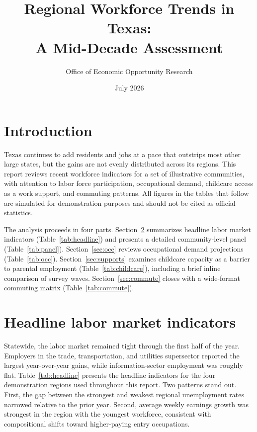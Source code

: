 \documentclass[11pt]{article}
\title{Regional Workforce Trends in Texas:\\ A Mid-Decade Assessment}
\author{Office of Economic Opportunity Research}
\date{July 2026}
\begin{document}
\maketitle

\section{Introduction}

Texas continues to add residents and jobs at a pace that outstrips most other
large states, but the gains are not evenly distributed across its regions. This
report reviews recent workforce indicators for a set of illustrative
communities, with attention to labor force participation, occupational demand,
childcare access as a work support, and commuting patterns. All figures in the
tables that follow are simulated for demonstration purposes and should not be
cited as official statistics.

The analysis proceeds in four parts. Section~\ref{sec:labor} summarizes
headline labor market indicators (Table~\ref{tab:headline}) and presents a
detailed community-level panel (Table~\ref{tab:panel}). Section~\ref{sec:occ}
reviews occupational demand projections (Table~\ref{tab:occ}). Section~\ref{sec:supports}
examines childcare capacity as a barrier to parental employment
(Table~\ref{tab:childcare}), including a brief inline comparison of survey
waves. Section~\ref{sec:commute} closes with a wide-format commuting matrix
(Table~\ref{tab:commute}).

\section{Headline labor market indicators}\label{sec:labor}

Statewide, the labor market remained tight through the first half of the year.
Employers in the trade, transportation, and utilities supersector reported the
largest year-over-year gains, while information-sector employment was roughly
flat. Table~\ref{tab:headline} presents the headline indicators for the four
demonstration regions used throughout this report. Two patterns stand out.
First, the gap between the strongest and weakest regional unemployment rates
narrowed relative to the prior year. Second, average weekly earnings growth
was strongest in the region with the youngest workforce, consistent with
compositional shifts toward higher-paying entry occupations.
\end{document}
